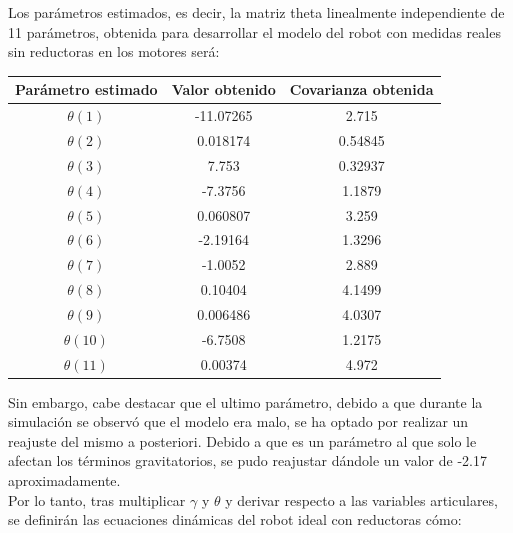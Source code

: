Los parámetros estimados, es decir, la matriz theta linealmente independiente de 11 parámetros, obtenida para desarrollar el modelo del robot con medidas reales sin reductoras en los motores será:

\begin{center}

	\begin{tabular}{| c | c | c |}
		\hline
		Parámetro estimado & Valor obtenido & Covarianza obtenida \\
		\hline
		$\theta(1) $ & -11.07265 & 2.715 \\
		\hline
		$\theta(2) $ & 0.018174 & 0.54845 \\

		\hline

		$\theta(3) $ & 7.753 & 0.32937 \\

		\hline

		$\theta(4) $ & -7.3756 & 1.1879 \\

		\hline

		$\theta(5) $ & 0.060807 & 3.259 \\

		\hline

		$\theta(6) $ & -2.19164 & 1.3296 \\

		\hline

		$\theta(7) $ & -1.0052 & 2.889 \\

		\hline

		$\theta(8) $ & 0.10404 & 4.1499 \\

		\hline

		$\theta(9) $ & 0.006486 & 4.0307 \\

		\hline

		$\theta(10) $ & -6.7508 & 1.2175 \\

		\hline

		$\theta(11) $ & 0.00374 & 4.972 \\

		\hline
	\end{tabular}

\end{center}

Sin embargo, cabe destacar que el ultimo parámetro, debido a que durante la simulación se observó que el modelo era malo, se ha optado por realizar un reajuste del mismo a posteriori. Debido a que es un parámetro al que solo le afectan los términos gravitatorios, se pudo reajustar dándole un valor de -2.17 aproximadamente. \\
Por lo tanto, tras multiplicar $\gamma$ y $\theta$ y derivar respecto a las variables articulares, se definirán las ecuaciones dinámicas del robot ideal con reductoras cómo:\\


